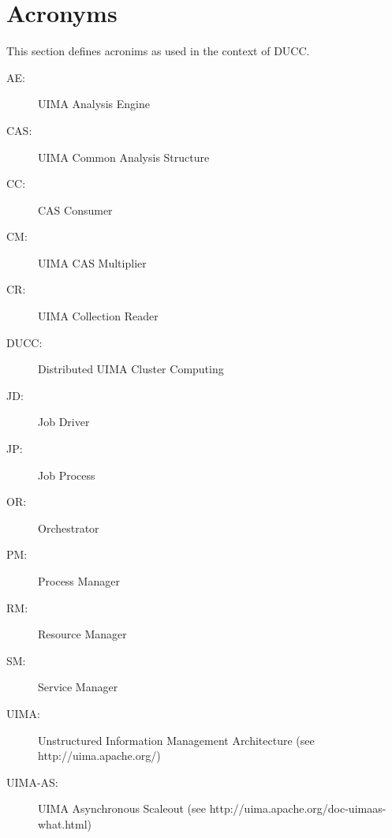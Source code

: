 \section{Acronyms}
This section defines acronims as used in the context of DUCC. 

\begin{description}
\item[AE:] UIMA Analysis Engine 
\item[CAS:] UIMA Common Analysis Structure 
\item[CC:] CAS Consumer 
\item[CM:] UIMA CAS Multiplier 
\item[CR:] UIMA Collection Reader 
\item[DUCC:] Distributed UIMA Cluster Computing 
\item[JD:] Job Driver 
\item[JP:] Job Process 
\item[OR:] Orchestrator 
\item[PM:] Process Manager 
\item[RM:] Resource Manager 
\item[SM:] Service Manager 
\item[UIMA:] Unstructured Information Management Architecture (see http://uima.apache.org/) 
\item[UIMA-AS:] UIMA Asynchronous Scaleout (see http://uima.apache.org/doc-uimaas-what.html) 
\end{description}

